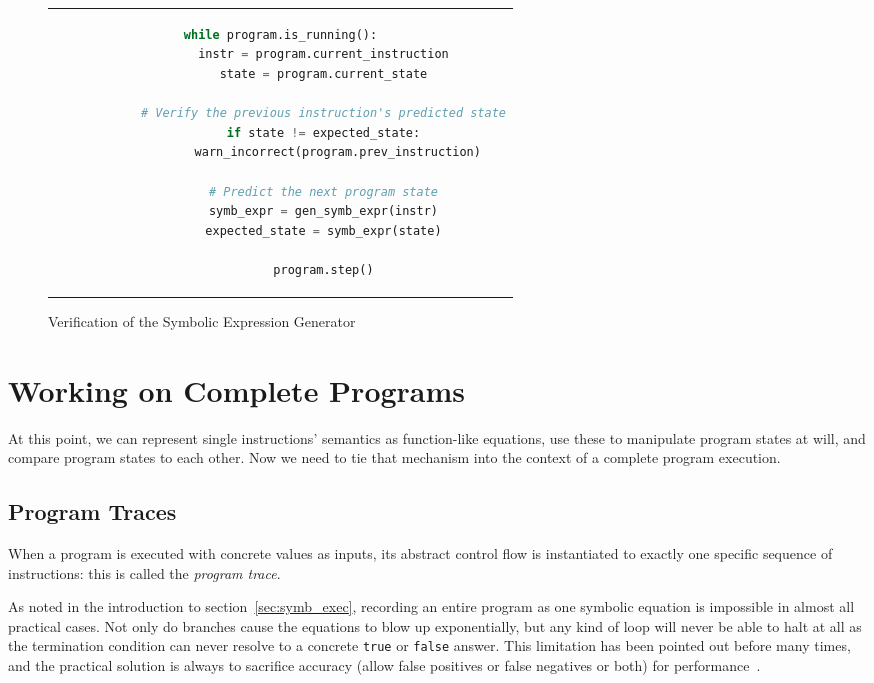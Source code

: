 \begin{figure}[htbp]
    \centering
    \begin{tabular}{c}
    \begin{lstlisting}[language=Python]
        while program.is_running():
            instr = program.current_instruction
            state = program.current_state

            # Verify the previous instruction's predicted state
            if state != expected_state:
                warn_incorrect(program.prev_instruction)

            # Predict the next program state
            symb_expr = gen_symb_expr(instr)
            expected_state = symb_expr(state)

            program.step()
    \end{lstlisting}
    \end{tabular}
    \caption{Verification of the Symbolic Expression Generator}\label{fig:symb_generator_verification}
\end{figure}

\section{Working on Complete Programs}\label{sec:concolic_tracing}

At this point, we can represent single instructions' semantics as function-like equations, use these to manipulate
program states at will, and compare program states to each other. Now we need to tie that mechanism into the context of
a complete program execution.

\subsection{Program Traces}

When a program is executed with concrete values as inputs, its abstract control flow is instantiated to exactly one
specific sequence of instructions: this is called the \textit{program trace}.

As noted in the introduction to section~\ref{sec:symb_exec}, recording an entire program as one symbolic equation is
impossible in almost all practical cases. Not only do branches cause the equations to blow up exponentially, but any
kind of loop will never be able to halt at all as the termination condition can never resolve to a concrete
\texttt{true} or \texttt{false} answer. This limitation has been pointed out before many times, and the practical
solution is always to sacrifice accuracy (allow false positives or false negatives or both) for
performance~\cite{Baldoni2018SymbexecSurvey}.

